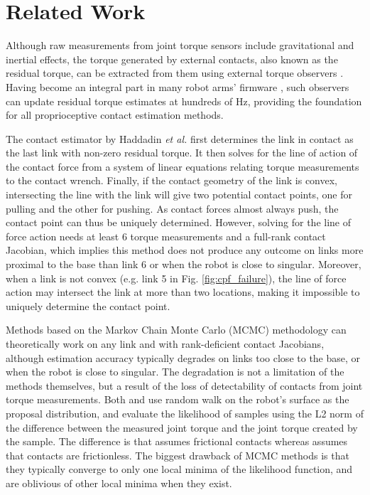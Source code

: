 \section{Related Work}
Although raw measurements from joint torque sensors include gravitational and inertial effects, the torque generated by external contacts, also known as the residual torque, can be extracted from them using external torque observers \cite{haddadin2017robot}. Having become an integral part in many robot arms' firmware \cite{loughlin2007dlr, franka}, such observers can update residual torque estimates at hundreds of Hz, providing the foundation for all proprioceptive contact estimation methods.

The contact estimator by Haddadin \textit{et al.} \cite{haddadin2017robot} first determines the link in contact as the last link with non-zero residual torque. It then solves for the line of action of the contact force from a system of linear equations relating torque measurements to the contact wrench. Finally, if the contact geometry of the link is convex, intersecting the line with the link will give two potential contact points, one for pulling and the other for pushing. As contact forces almost always push, the contact point can thus be uniquely determined. However, solving for the line of force action needs at least 6 torque measurements and a full-rank contact Jacobian, which implies this method does not produce any outcome on links more proximal to the base than link 6 or when the robot is close to singular. Moreover, when a link is not convex (e.g. link 5 in Fig. \ref{fig:cpf_failure}), the line of force action may intersect the link at more than two locations, making it impossible to uniquely determine the contact point.

Methods based on the Markov Chain Monte Carlo (MCMC) methodology \cite{manuelli2016localizing, zwiener2019armcl} can theoretically work on any link and with rank-deficient contact Jacobians, although estimation accuracy typically degrades on links too close to the base, or when the robot is close to singular. The degradation is not a limitation of the methods themselves, but a result of the loss of detectability of contacts from joint torque measurements. Both \cite{manuelli2016localizing} and \cite{zwiener2019armcl} use random walk on the robot's surface as the proposal distribution, and evaluate the likelihood of samples using the L2 norm of the difference between the measured joint torque and the joint torque created by the sample. The difference is that \cite{manuelli2016localizing} assumes frictional contacts whereas \cite{zwiener2019armcl} assumes that contacts are frictionless. The biggest drawback of MCMC methods is that they typically converge to only one local minima of the likelihood function, and are oblivious of other local minima when they exist.

